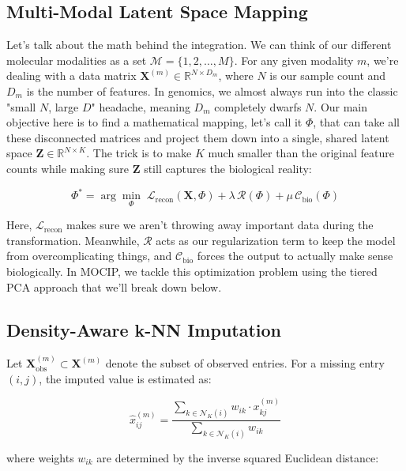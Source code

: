 \documentclass[conference,flushend]{iaria} %
\begin{document}
\subsection{Multi-Modal Latent Space Mapping}
Let's talk about the math behind the integration. We can think of our different molecular modalities as a set $\mathcal{M} = \{1, 2, \ldots, M\}$. For any given modality $m$, we're dealing with a data matrix $\mathbf{X}^{(m)} \in \mathbb{R}^{N \times D_m}$, where $N$ is our sample count and $D_m$ is the number of features. In genomics, we almost always run into the classic "small $N$, large $D$" headache, meaning $D_m$ completely dwarfs $N$. Our main objective here is to find a mathematical mapping, let's call it $\Phi$, that can take all these disconnected matrices and project them down into a single, shared latent space $\mathbf{Z} \in \mathbb{R}^{N \times K}$. The trick is to make $K$ much smaller than the original feature counts while making sure $\mathbf{Z}$ still captures the biological reality:

\begin{equation}
\Phi^{*} = \arg\min_{\Phi} \; \mathcal{L}_{\text{recon}}(\mathbf{X}, \Phi) + \lambda \, \mathcal{R}(\Phi) + \mu \, \mathcal{C}_{\text{bio}}(\Phi)
\end{equation}

Here, $\mathcal{L}_{\text{recon}}$ makes sure we aren't throwing away important data during the transformation. Meanwhile, $\mathcal{R}$ acts as our regularization term to keep the model from overcomplicating things, and $\mathcal{C}_{\text{bio}}$ forces the output to actually make sense biologically. In MOCIP, we tackle this optimization problem using the tiered PCA approach that we'll break down below.

\subsection{Density-Aware k-NN Imputation}
Let $\mathbf{X}^{(m)}_{\text{obs}} \subset \mathbf{X}^{(m)}$ denote the subset of observed entries. For a missing entry $(i, j)$, the imputed value is estimated as:

\begin{equation}
\hat{x}^{(m)}_{ij} = \frac{\sum_{k \in \mathcal{N}_K(i)} w_{ik} \cdot x^{(m)}_{kj}}{\sum_{k \in \mathcal{N}_K(i)} w_{ik}}
\end{equation}

where weights $w_{ik}$ are determined by the inverse squared Euclidean distance:
\end{document}
